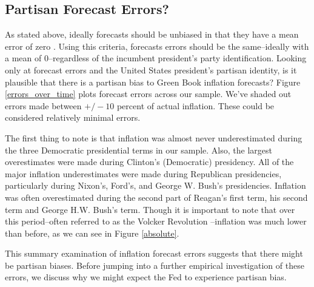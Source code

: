 \documentclass[a4paper]{article}\usepackage{graphicx, color}
\begin{document}
\subsection{Partisan Forecast Errors?}

As stated above, ideally forecasts should be unbiased in that they have a mean error of zero \citep[5]{Bruck2006}. Using this criteria, forecasts errors should be the same--ideally with a mean of 0--regardless of the incumbent president's party identification. Looking only at forecast errors and the United States president's partisan identity, is it plausible that there is a partisan bias to Green Book inflation forecasts? Figure \ref{errors_over_time} plots forecast errors across our sample. We've shaded out errors made between $+/- 10$ percent of actual inflation. These could be considered relatively minimal errors. 

The first thing to note is that inflation was almost never underestimated during the three Democratic presidential terms in our sample. Also, the largest overestimates were made during Clinton's (Democratic) presidency. All of the major inflation underestimates were made during Republican presidencies, particularly during Nixon's, Ford's, and George W. Bush's presidencies. Inflation was often overestimated during the second part of Reagan's first term, his second term and George H.W. Bush's term. Though it is important to note that over this period--often referred to as the Volcker Revolution \citep[see][]{Bartels1985}--inflation was much lower than before, as we can see in Figure \ref{absolute}.

This summary examination of inflation forecast errors suggests that there might be partisan biases. Before jumping into a further empirical investigation of these errors, we discuss why we might expect the Fed to experience partisan bias.
\end{document}
